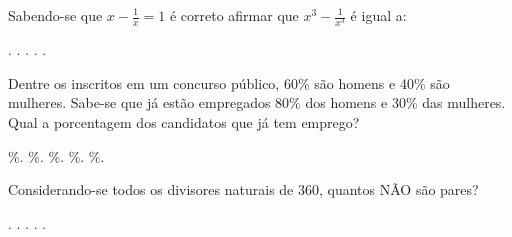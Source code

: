 \begin{question}%
Sabendo-se que \(x - \frac{1}{x} = 1\) é correto afirmar que \(x^3 - \frac{1}{x^3}\) é igual a:
    \begin{tasks}
        .
        .
        .
        .
        .
    \end{tasks}
\end{question}

\begin{question}%
Dentre os inscritos em um concurso público, 60\% são homens e 40\% são mulheres. Sabe-se que já estão empregados 80\% dos homens e 30\% das mulheres. Qual a porcentagem dos candidatos que já tem emprego?
    \begin{tasks}
        \%.
        \%.
        \%.
        \%.
        \%.
    \end{tasks}
\end{question}

\begin{question}%
Considerando-se todos os divisores naturais de 360, quantos NÃO são pares?
    \begin{tasks}
        .
        .
        .
        .
        .
    \end{tasks}
\end{question}